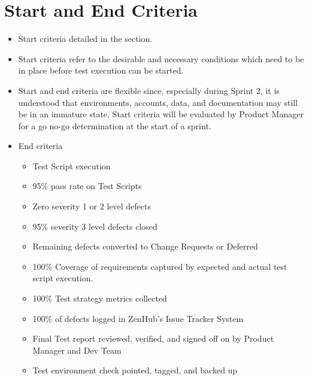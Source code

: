 \documentclass[letterpaper,10pt,english,openany,oneside]{sphinxmanual}
\begin{document}
\section{Start and End Criteria}
\label{\detokenize{test_plan/issue_management:start-and-end-criteria}}\begin{itemize}
\item {} 
Start criteria detailed in the {\hyperref[\detokenize{test_plan/strategy:strategy}]{}} section.

\item {} 
Start criteria refer to the desirable and necessary conditions which need to be in place before test execution can be started.

\item {} 
Start and end criteria are flexible since, especially during Sprint 2, it is understood that environments, accounts, data, and documentation may still be in an immature state. Start criteria will be evaluated by Product Manager for a go no-go determination at the start of a sprint.

\item {} 
End criteria
\begin{itemize}
\item {} 
Test Script execution     

\item {} 
95\% pass rate on Test Scripts             

\item {} 
Zero severity 1 or 2 level defects        

\item {} 
95\% severity 3 level defects closed 

\item {} 
Remaining defects converted to Change Requests or Deferred   

\item {} 
100\% Coverage of requirements captured by expected and actual test script execution.                      

\item {} 
100\% Test strategy metrics collected      

\item {} 
100\% of defects logged in ZenHub’s  Issue Tracker System  

\item {} 
Final Test report reviewed, verified, and signed off on by Product Manager and Dev Team

\item {} 
Test environment check pointed, tagged, and backed up     

\end{itemize}

\end{itemize}
\end{document}
